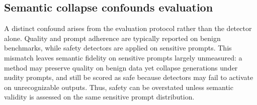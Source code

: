 

\subsection{Semantic collapse confounds evaluation}

A distinct confound arises from the evaluation protocol rather than the detector alone. Quality and prompt adherence are typically reported on benign benchmarks, while safety detectors are applied on sensitive prompts. This mismatch leaves semantic fidelity on sensitive prompts largely unmeasured: a method may preserve quality on benign data yet collapse generations under nudity prompts, and still be scored as safe because detectors may fail to activate on unrecognizable outputs. Thus, safety can be overstated unless semantic validity is assessed on the same sensitive prompt distribution.




